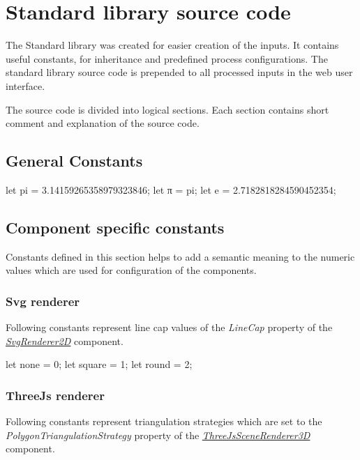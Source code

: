 
\chapter{Standard library source code}
\label{chap:stdLib}

The Standard library was created for easier creation of the inputs.
It contains useful constants, \lsystems for inheritance and predefined process configurations.
The standard library source code is prepended to all processed inputs in the web user interface.

The source code is divided into logical sections.
Each section contains short comment and explanation of the source code.


\section{General Constants}

\begin{LsystemBreak}
let pi = 3.14159265358979323846;
let π = pi;
let e = 2.7182818284590452354;
\end{LsystemBreak}


\section{Component specific constants}

Constants defined in this section helps to add a semantic meaning to the numeric values which are used for configuration of the components.

\subsection{Svg renderer}
\label{sec:stdLibSvgRenderer}

Following constants represent line cap values of the \emph{LineCap} property of the \hyperref[Malsys.Processing.Components.Renderers.SvgRenderer2D]{\emph{SvgRenderer2D}} component.

\begin{LsystemBreak}
let none = 0;
let square = 1;
let round = 2;
\end{LsystemBreak}


\subsection{ThreeJs renderer}
\label{sec:stdLibThreeJs}

Following constants represent triangulation strategies which are set to the \emph{PolygonTriangulationStrategy} property of the \hyperref[Malsys.Processing.Components.Renderers.ThreeJsSceneRenderer3D]{\emph{ThreeJsSceneRenderer3D}} component.

